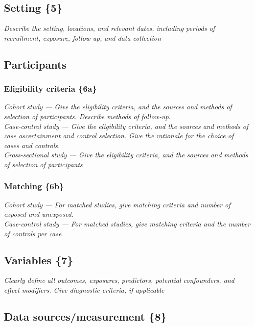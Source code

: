 \subsection{Setting \{5\}}

{\em Describe the setting, locations, and relevant dates, including periods
of recruitment, exposure, follow-up, and data collection}

\subsection{Participants}

\subsubsection{Eligibility criteria \{6a\}}

{\em Cohort study — Give the eligibility criteria, and the sources and
methods of selection of participants. Describe methods of follow-up.\\
Case-control study — Give the eligibility criteria, and the sources and
methods of case ascertainment and control selection. Give the
rationale for the choice of cases and controls.\\
Cross-sectional study — Give the eligibility criteria, and the sources
and methods of selection of participants}

\subsubsection{Matching \{6b\}}

{\em Cohort study — For matched studies, give matching criteria and number
of exposed and unexposed.\\
Case-control study — For matched studies, give matching criteria and
the number of controls per case}

\subsection{Variables \{7\}}

{\em Clearly define all outcomes, exposures, predictors, potential
confounders, and effect modifiers. Give diagnostic criteria, if
applicable }

\subsection{Data sources/measurement \{8\}}

